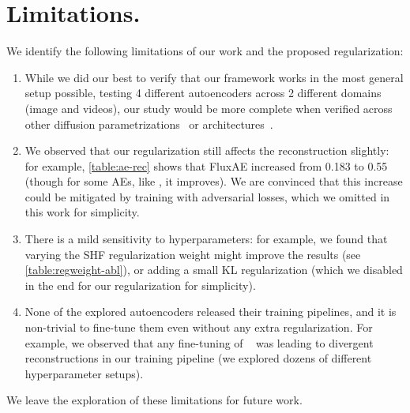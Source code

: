 \section{Limitations.}

We identify the following limitations of our work and the proposed regularization:
\begin{enumerate}
    \item While we did our best to verify that our framework works in the most general setup possible, testing 4 different autoencoders across 2 different domains (image and videos), our study would be more complete when verified across other diffusion parametrizations~\cite{EDM, DDPM, VDM++} or architectures~\cite{EDMv2}.
    \item We observed that our regularization still affects the reconstruction slightly: for example, \cref{table:ae-rec} shows that FluxAE \fid increased from 0.183 to 0.55 (though for some AEs, like \cvaefull, it improves). We are convinced that this \fid increase could be mitigated by training with adversarial losses, which we omitted in this work for simplicity.
    \item There is a mild sensitivity to hyperparameters: for example, we found that varying the SHF regularization weight might improve the results (see \cref{table:regweight-abl}), or adding a small KL regularization (which we disabled in the end for our regularization for simplicity).
    \item None of the explored autoencoders released their training pipelines, and it is non-trivial to fine-tune them even without any extra regularization. For example, we observed that any fine-tuning of \dcae~\cite{DC-AE} was leading to divergent reconstructions in our training pipeline (we explored dozens of different hyperparameter setups). 
\end{enumerate}

We leave the exploration of these limitations for future work.
